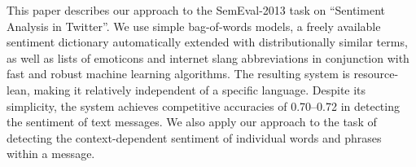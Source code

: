 This paper describes our approach to the SemEval-2013 task on ``Sentiment Analysis in Twitter''. We use simple bag-of-words models, a freely available
 sentiment dictionary automatically extended with distributionally similar
 terms, as well as lists of emoticons and internet slang abbreviations in
 conjunction with fast and robust machine learning algorithms. The resulting
 system is resource-lean, making it relatively independent of a specific
 language. Despite its simplicity, the system achieves competitive accuracies of
 0.70--0.72 in detecting the sentiment of text messages. We also apply our
 approach to the task of detecting the context-dependent sentiment of individual
 words and phrases within a message.

